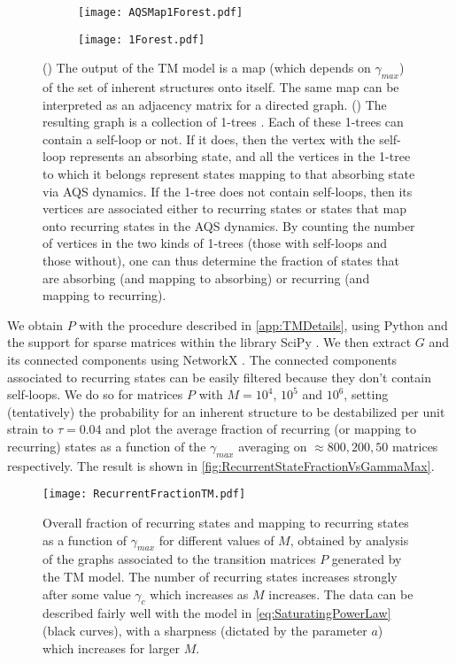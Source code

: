 \begin{figure}
	\centering
	\begin{subfigure}[b]{0.8\textwidth}
			\centering
			\texttt{[image: AQSMap1Forest.pdf]}
			\caption{\label{fig:TMEndomorphism}}
	\end{subfigure}
	\begin{subfigure}[b]{0.8\textwidth}
			\centering
			\texttt{[image: 1Forest.pdf]}
			\caption{\label{fig:TM1Forest}}
	\end{subfigure}
	\caption{() The output of the TM model is a map (which depends on $\gamma_{max}$) of the set of inherent structures onto itself. The same map can be interpreted as an adjacency matrix for a directed graph. () The resulting graph is a collection of 1-trees \cite{bollobas1998modern}. Each of these 1-trees can contain a self-loop or not. If it does, then the vertex with the self-loop represents an absorbing state, and all the vertices in the 1-tree to which it belongs represent states mapping to that absorbing state via AQS dynamics. If the 1-tree does not contain self-loops, then its vertices are associated either to recurring states or states that map onto recurring states in the AQS dynamics. By counting the number of vertices in the two kinds of 1-trees (those with self-loops and those without), one can thus determine the fraction of states that are absorbing (and mapping to absorbing) or recurring (and mapping to recurring).\label{fig:DirectedGraphFromP}}
\end{figure}

We obtain $P$ with the procedure described in \autoref{app:TMDetails}, using Python and the support for sparse matrices within the library SciPy \cite{scipy}. We then extract $G$ and its connected components using NetworkX \cite{networkx}. The connected components associated to recurring states can be easily filtered because they don't contain self-loops. We do so for matrices $P$ with $M = 10^{4}$, $10^{5}$ and $10^{6}$, setting (tentatively) the probability for an inherent structure to be destabilized per unit strain to $\tau = 0.04$ and plot the average fraction of recurring (or mapping to recurring) states as a function of the $\gamma_{max}$ averaging on $\approx 800, 200, 50$ matrices respectively.
The result is shown in \autoref{fig:RecurrentStateFractionVsGammaMax}.  

\begin{figure} 
\centering 
\texttt{[image: RecurrentFractionTM.pdf]} 
\caption{Overall fraction of recurring states and mapping to recurring states as a function of $\gamma_{max}$ for different values of $M$, obtained by analysis of the graphs associated to the transition matrices $P$ generated by the TM model. The number of recurring states increases strongly after some value $\gamma_{c}$ which increases as $M$ increases. The data can be described fairly well with the model in \autoref{eq:SaturatingPowerLaw} (black curves), with a sharpness (dictated by the parameter $a$) which increases for larger $M$. \label{fig:RecurrentStateFractionVsGammaMax}}
\end{figure}

